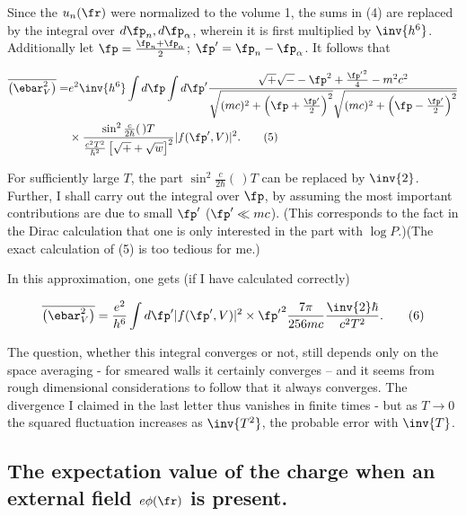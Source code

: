\documentclass{article}
\newcommand{\nequ}[2]{
\begin{align*}
#1
\tag{#2}
\end{align*}
}
\begin{document}
Since the $u_n(\fr)$ were normalized to the volume 1, the sums in (4) are replaced by the integral over ${d\fp_n},{d\fp_\alpha}$, wherein it is first multiplied by $\inv{h^6}$. Additionally let $\fp = \frac{\fp_n + \fp_\alpha}{2}$; $\fp' = \fp_n - \fp_\alpha$. It follows that
\nequ{
\overline{\left(\ebar^2_V\right)} = &e^2\inv{h^6}\int{d\fp}\int{d\fp'}
    \frac{\sqrt{+}\sqrt{-} - \fp^2 + \frac{{\fp'}^2}{4} - m^2 c^2}
         {\sqrt{(mc)^2 + \left(\fp + \frac{\fp'}{2}\right)^2}
          \sqrt{(mc)^2 + \left(\fp - \frac{\fp'}{2}\right)^2}}\\
&\times \frac{\sin^2{\frac{c}{2\hbar}(\,)T}}
             {\frac{c^2 T^2}{\hbar^2}\left[\sqrt{+} + \sqrt{w}\right]^2}|f(\fp',V)|^2.
}{5}
For sufficiently large $T$, the part $\sin^2{\frac{c}{2\hbar}(\,)T}$ can be replaced by $\inv{2}$. Further, I shall carry out the integral over $\fp$, by assuming the most important contributions are due to small $\fp'$ ($\fp' \ll mc$). (This corresponds to the fact in the Dirac calculation that one is only interested in the part with $\log P$.)(The exact calculation of (5) is too tedious for me.)

In this approximation, one gets (if I have calculated correctly)
\nequ{
\overline{\left(\ebar^2_V\right)} = \frac{e^2}{h^6}\int{d\fp'}|f(\fp',V)|^2 
\times {\fp'}^2 \frac{7\pi}{256mc} \frac{\inv{2}\hbar}{c^2 T^2}.
}{6}
The question, whether this integral converges or not, still depends only on the space averaging - for smeared walls it certainly converges -- and it seems from rough dimensional considerations to follow that it always converges. The divergence I claimed in the last letter thus vanishes in finite times - but as $T\to 0$ the squared fluctuation increases as $\inv{T^2}$, the probable error with $\inv{T}$.

\subsection*{The expectation value of the charge when an external field $e\phi(\fr)$ is present.}
\end{document}
